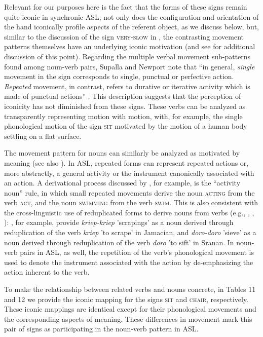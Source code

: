 \documentclass[output=paper,
modfonts
]{LSP/langsci}
\begin{document}
  Relevant for our purposes here is the fact that the forms of these signs remain quite iconic in synchronic ASL; not only does the configuration and orientation of the hand iconically profile aspects of the referent object, as we discuss below, but, similar to the discussion of the sign \textsc{very-slow} in , the contrasting movement patterns themselves have an underlying iconic motivation (and see \citealt{Wilcox2004} for additional discussion of this point). Regarding the multiple verbal movement sub-patterns found among noun-verb pairs, Supalla and Newport note that ``in general, \textit{single} movement in the sign corresponds to single, punctual or perfective action. \textit{Repeated} movement, in contrast, refers to durative or iterative activity which is made of punctual actions'' \citep[103--104]{Supalla1978}. This description suggests that the perception of iconicity has not diminished from these signs. These verbs can be analyzed as transparently representing motion with motion, with, for example, the single phonological motion of the sign \textsc{sit} motivated by the motion of a human body settling on a flat surface.

  The movement pattern for nouns can similarly be analyzed as motivated by meaning (see also \citealt[131--132]{Wilcox2004}). In ASL, repeated forms can represent repeated actions or, more abstractly, a general activity or the instrument canonically associated with an action. A derivational process discussed by  \citet[343]{Padden1987}, for example, is the ``activity noun'' rule, in which small repeated movements derive the noun \textsc{acting} from the verb \textsc{act,} and the noun \textsc{swimming} from the verb \textsc{swim}. This is also consistent with the cross-linguistic use of reduplicated forms to derive nouns from verbs (e.g., \citealt{Nivens1993}, \citealt{Kouwenberg2001}, \citealt{Adelaar2005}): \citet[984]{Kouwenberg2015}, for example, provide \textit{kriep-kriep} 'scrapings' as a noun derived through reduplication of the verb \textit{kriep} 'to scrape' in Jamacian, and \textit{doro-doro} 'sieve' as a noun derived through reduplication of the verb \textit{doro} 'to sift' in Sranan. In noun-verb pairs in ASL, as well, the repetition of the verb's phonological movement is used to denote the instrument associated with the action by de-emphasizing the action inherent to the verb.

  To make the relationship between related verbs and nouns concrete, in Tables 11 and 12 we provide the iconic mapping for the signs \textsc{sit} and \textsc{chair}, respectively. These iconic mappings are identical except for their phonological movements and the corresponding aspects of meaning. These differences in movement mark this pair of signs as participating in the noun-verb pattern in ASL.
\end{document}
